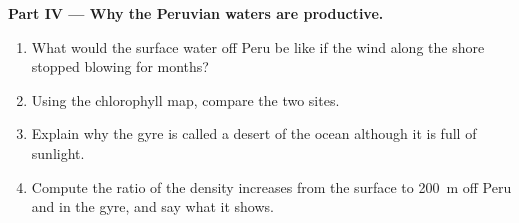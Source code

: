 \begin{problem}
\medskip
\noindent\textbf{Part IV --- Why the Peruvian waters are productive.}
\begin{enumerate}[resume]
  \item What would the surface water off Peru be like if the wind along the
        shore stopped blowing for months?
  \item Using the chlorophyll map, compare the two sites.
  \item Explain why the gyre is called a desert of the ocean although it is
        full of sunlight.
  \item Compute the ratio of the density increases from the surface to
        \qty{200}{m} off Peru and in the gyre, and say what it shows.
\end{enumerate}
\end{problem}
